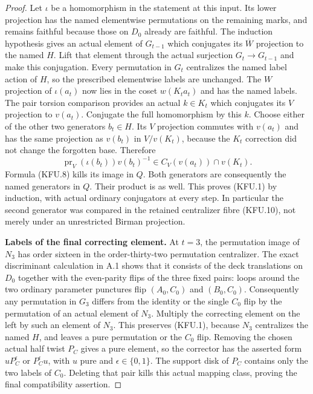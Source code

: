 \begin{proof}
Let $\iota$ be a homomorphism in the statement at this
input.  Its lower projection has the named elementwise
permutations on the remaining marks, and remains
faithful because those on $D_0$ already are faithful.
The induction hypothesis gives an actual element of
$G_{t-1}$ which conjugates its $\overline W$ projection
to the named $H$.  Lift that element through the actual
surjection $G_t\to G_{t-1}$ and make this conjugation.
Every permutation in $G_t$ centralizes the named label
action of $H$, so the prescribed elementwise labels
are unchanged.
The $W$ projection of $\iota(a_t)$ now lies in the
coset $w(K_ta_t)$ and has the named labels.  The pair
torsion comparison provides an actual $k\in K_t$
which conjugates its $V$ projection to $v(a_t)$.
Conjugate the full homomorphism by this $k$.
Choose either of the other two generators $b_t\in H$.
Its $V$ projection commutes with $v(a_t)$ and has the
same projection as $v(b_t)$ in $V/v(K_t)$, because
the $K_t$ correction did not change the forgotten
base.  Therefore
\[
           \operatorname{pr}_V(\iota(b_t))v(b_t)^{-1}
                     \in C_V(v(a_t))\cap v(K_t).       \tag{KFU.10}
\]
Formula (KFU.8) kills its image in $Q$.
Both generators are consequently the named generators
in $Q$.  Their product is as well.  This proves (KFU.1)
by induction, with actual ordinary conjugators at
every step.  In particular the second generator was
compared in the retained centralizer fibre (KFU.10),
not merely under an unrestricted Birman projection.

\par\medskip\noindent\textbf{Labels of the final correcting element.}\quad
At $t=3$, the permutation image of $N_3$ has order
sixteen in the order-thirty-two permutation centralizer.
The exact discriminant calculation in A.1 shows that
it consists of the deck translations on $D_0$ together
with the even-parity flips of the three fixed pairs:
loops around the two ordinary parameter punctures
flip $(A_0,C_0)$ and $(B_0,C_0)$.
Consequently any permutation in $G_3$ differs from
the identity or the single $C_0$ flip by the permutation
of an actual element of $N_3$.
Multiply the correcting element on the left by such
an element of $N_3$.  This preserves (KFU.1), because
$N_3$ centralizes the named $H$, and leaves a pure
permutation or the $C_0$ flip.  Removing the chosen
actual half twist $P_C$ gives a pure element, so the
corrector has the asserted form $uP_C^\epsilon$ or
$P_C^\epsilon u$, with $u$ pure and $\epsilon\in\{0,1\}$.
The support disk of $P_C$ contains only the two labels
of $C_0$.  Deleting that pair kills this actual mapping
class, proving the final compatibility assertion.


\end{proof}
